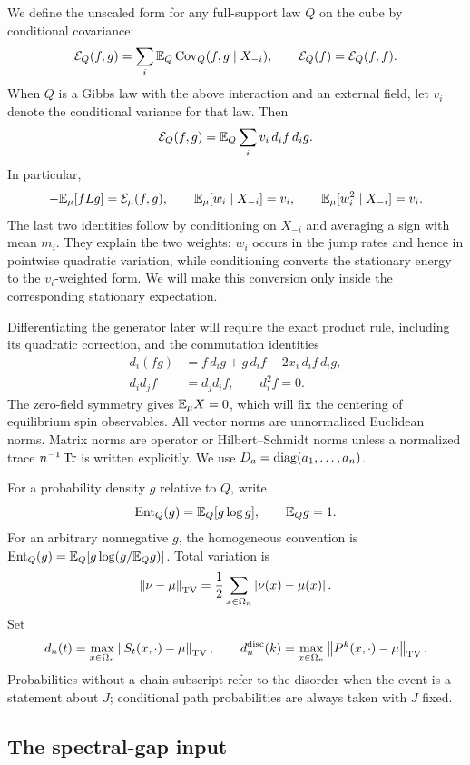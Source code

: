 We define the unscaled form for any full-support law \(Q\) on the cube
by conditional covariance:
\[
 \mathcal E_Q(f,g)
   =\sum_i \mathbb E_Q\operatorname{Cov}_Q(f,g\mid X_{-i}),\qquad
 \mathcal E_Q(f)=\mathcal E_Q(f,f).
\]
When \(Q\) is a Gibbs law with the above interaction and an external
field, let \(v_i\) denote the conditional variance for that law.  Then
\begin{equation}
 \mathcal E_Q(f,g)=\mathbb E_Q\sum_i v_i\,d_i f\,d_i g.
 \label{eq:model-dirichlet}
\end{equation}
In particular,
\[
 -\mathbb E_\mu[fLg]=\mathcal E_\mu(f,g),\qquad
 \mathbb E_\mu[w_i\mid X_{-i}]=v_i,\qquad
 \mathbb E_\mu[w_i^2\mid X_{-i}]=v_i.
\]
The last two identities follow by conditioning on \(X_{-i}\) and
averaging a sign with mean \(m_i\).  They explain the two weights:
\(w_i\) occurs in the jump rates and hence in pointwise quadratic
variation, while conditioning converts the stationary energy to the
\(v_i\)-weighted form.  We will make this conversion only inside the
corresponding stationary expectation.

Differentiating the generator later will require the exact product
rule, including its quadratic correction, and the commutation identities
\begin{align}
 d_i(fg)&=f\,d_i g+g\,d_i f-2x_i\,d_i f\,d_i g,
 \label{eq:model-product}\\
 d_i d_jf&=d_jd_if,\qquad d_i^2f=0.
 \label{eq:model-commute}
\end{align}
The zero-field symmetry gives \(\mathbb E_\mu X=0\), which will fix the
centering of equilibrium spin observables.  All vector norms are
unnormalized Euclidean norms.
Matrix norms are operator or Hilbert--Schmidt norms unless a normalized
trace \(n^{-1}\operatorname{Tr}\) is written explicitly.
We use \(D_a=\operatorname{diag}(a_1,\ldots,a_n)\).

For a probability density \(g\) relative to \(Q\), write
\[
 \operatorname{Ent}_Q(g)=\mathbb E_Q[g\log g],\qquad \mathbb E_Qg=1.
\]
For an arbitrary nonnegative \(g\), the homogeneous convention is
\(\operatorname{Ent}_Q(g)=\mathbb E_Q[g\log(g/\mathbb E_Qg)]\).
Total variation is
\[
 \left\lVert \nu-\mu\right\rVert_{\operatorname{TV}}
   =\frac12\sum_{x\in\Omega_n}\left\lvert \nu(x)-\mu(x)\right\rvert.
\]
Set
\[
 d_n(t)=\max_{x\in\Omega_n}\left\lVert S_t(x,\cdot)-\mu\right\rVert_{\operatorname{TV}},
 \qquad
 d_n^{\rm disc}(k)=\max_{x\in\Omega_n}\left\lVert P^k(x,\cdot)-\mu\right\rVert_{\operatorname{TV}}.
\]
Probabilities without a chain subscript refer to the disorder when
the event is a statement about \(J\); conditional path probabilities
are always taken with \(J\) fixed.

\subsection{The spectral-gap input}

